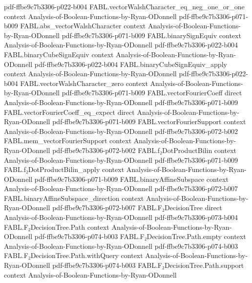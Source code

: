 \begin{theorem}
  {pdf-ffbe9c7b3306-p022-b004}
\proofstep
  {FABL.vectorWalshCharacter_eq_neg_one_or_one}
  {context}
  {Analysis-of-Boolean-Functions-by-Ryan-ODonnell}
  {pdf-ffbe9c7b3306-p071-b009}
\proofstep
  {FABL.abs_vectorWalshCharacter}
  {context}
  {Analysis-of-Boolean-Functions-by-Ryan-ODonnell}
  {pdf-ffbe9c7b3306-p071-b009}
\proofstep
  {FABL.binarySignEquiv}
  {context}
  {Analysis-of-Boolean-Functions-by-Ryan-ODonnell}
  {pdf-ffbe9c7b3306-p022-b004}
\proofstep
  {FABL.binaryCubeSignEquiv}
  {context}
  {Analysis-of-Boolean-Functions-by-Ryan-ODonnell}
  {pdf-ffbe9c7b3306-p022-b004}
\proofstep
  {FABL.binaryCubeSignEquiv_apply}
  {context}
  {Analysis-of-Boolean-Functions-by-Ryan-ODonnell}
  {pdf-ffbe9c7b3306-p022-b004}
\proofstep
  {FABL.vectorWalshCharacter_zero}
  {context}
  {Analysis-of-Boolean-Functions-by-Ryan-ODonnell}
  {pdf-ffbe9c7b3306-p071-b009}
\proofstep
  {FABL.vectorFourierCoeff}
  {direct}
  {Analysis-of-Boolean-Functions-by-Ryan-ODonnell}
  {pdf-ffbe9c7b3306-p071-b009}
\proofstep
  {FABL.vectorFourierCoeff_eq_expect}
  {direct}
  {Analysis-of-Boolean-Functions-by-Ryan-ODonnell}
  {pdf-ffbe9c7b3306-p071-b009}
\proofstep
  {FABL.vectorFourierSupport}
  {context}
  {Analysis-of-Boolean-Functions-by-Ryan-ODonnell}
  {pdf-ffbe9c7b3306-p072-b002}
\proofstep
  {FABL.mem_vectorFourierSupport}
  {context}
  {Analysis-of-Boolean-Functions-by-Ryan-ODonnell}
  {pdf-ffbe9c7b3306-p072-b002}
\proofstep
  {FABL.f₂DotProductBilin}
  {context}
  {Analysis-of-Boolean-Functions-by-Ryan-ODonnell}
  {pdf-ffbe9c7b3306-p071-b009}
\proofstep
  {FABL.f₂DotProductBilin_apply}
  {context}
  {Analysis-of-Boolean-Functions-by-Ryan-ODonnell}
  {pdf-ffbe9c7b3306-p071-b009}
\proofstep
  {FABL.binaryAffineSubspace}
  {context}
  {Analysis-of-Boolean-Functions-by-Ryan-ODonnell}
  {pdf-ffbe9c7b3306-p072-b007}
\proofstep
  {FABL.binaryAffineSubspace_direction}
  {context}
  {Analysis-of-Boolean-Functions-by-Ryan-ODonnell}
  {pdf-ffbe9c7b3306-p072-b007}
\proofstep
  {FABL.F₂DecisionTree}
  {direct}
  {Analysis-of-Boolean-Functions-by-Ryan-ODonnell}
  {pdf-ffbe9c7b3306-p073-b004}
\proofstep
  {FABL.F₂DecisionTree.Path}
  {context}
  {Analysis-of-Boolean-Functions-by-Ryan-ODonnell}
  {pdf-ffbe9c7b3306-p074-b003}
\proofstep
  {FABL.F₂DecisionTree.Path.empty}
  {context}
  {Analysis-of-Boolean-Functions-by-Ryan-ODonnell}
  {pdf-ffbe9c7b3306-p074-b003}
\proofstep
  {FABL.F₂DecisionTree.Path.withQuery}
  {context}
  {Analysis-of-Boolean-Functions-by-Ryan-ODonnell}
  {pdf-ffbe9c7b3306-p074-b003}
\proofstep
  {FABL.F₂DecisionTree.Path.support}
  {context}
  {Analysis-of-Boolean-Functions-by-Ryan-ODonnell}

\end{theorem}
